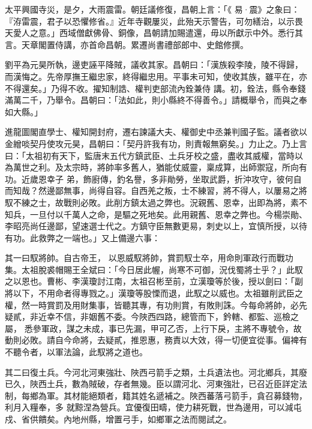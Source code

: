 \begin{pinyinscope}
 太平興國寺災，是夕，大雨震雷。朝廷議修復，昌朝上言：「《
 易·震》之象曰：『洊雷震，君子以恐懼修省。』近年寺觀屢災，此殆天示警告，可勿繕治，以示畏天愛人之意。」西域僧獻佛骨、銅像，昌朝請加賜遣還，毋以所獻示中外。悉行其言。天章閣置侍講，亦首命昌朝。累遷尚書禮部郎中、史館修撰。



 劉平為元昊所執，邊吏誣平降賊，議收其家。昌朝曰：「漢族殺李陵，陵不得歸，而漢悔之。先帝厚撫王繼忠家，終得繼忠用。平事未可知，使收其族，雖平在，亦不得還矣。」乃得不收。擢知制誥、權判吏部流內銓兼侍
 講。初，銓法，縣令奉錢滿萬二千，乃舉令。昌朝曰：「法如此，則小縣終不得善令。」請概舉令，而與之奉如大縣。」



 進龍圖閣直學士、權知開封府，遷右諫議大夫、權御史中丞兼判國子監。議者欲以金繒啖契丹使攻元昊，昌朝曰：「契丹許我有功，則責報無窮矣。」力止之。乃上言曰：「太祖初有天下，監唐末五代方鎮武臣、土兵牙校之盛，盡收其威權，當時以為萬世之利。及太宗時，將帥率多舊人，猶能仗威靈，稟成算，出師禦寇，所向有功。近歲恩幸子
 弟，飾廚傳，釣名譽，多非勛勞，坐取武爵，折沖攻守，彼何自而知哉？然邊鄙無事，尚得自容。自西羌之叛，士不練習，將不得人，以屢易之將馭不練之士，故戰則必敗。此削方鎮太過之弊也。況親舊、恩幸，出即為將，素不知兵，一旦付以千萬人之命，是驅之死地矣。此用親舊、恩幸之弊也。今楊崇勛、李昭亮尚任邊鄙，望速選士代之。方鎮守臣無數更易，刺史以上，宜慎所授，以待有功。此救弊之一端也。」又上備邊六事：



 其一曰馭將帥。自古帝王，
 以恩威馭將帥，賞罰馭士卒，用命則軍政行而戰功集。太祖脫裘帽賜王全斌曰：「今日居此幄，尚寒不可御，況伐蜀將士乎？」此馭之以恩也。曹彬、李漢瓊討江南，太祖召彬至前，立漢瓊等於後，授以劍曰：「副將以下，不用命者得專戮之。」漢瓊等股慄而退，此馭之以威也。太祖雖削武臣之權，然一時賞罰及用財集事，皆聽其專，有功則賞，有敗則誅。今每命將帥，必先疑貳，非近幸不信，非姻舊不委。今陜西四路，總管而下，鈐轄、都監、巡檢之屬，
 悉參軍政，謀之未成，事已先漏，甲可乙否，上行下戾，主將不專號令，故動則必敗。請自今命將，去疑貳，推恩惠，務責以大效，得一切便宜從事。偏裨有不聽令者，以軍法論，此馭將之道也。



 其二曰復土兵。今河北河東強壯、陜西弓箭手之類，土兵遺法也。河北鄉兵，其廢已久，陜西土兵，數為賊破，存者無幾。臣以謂河北、河東強壯，已召近臣詳定法制，每鄉為軍。其材能絕類者，籍其姓名遞補之。陜西蕃落弓箭手，貪召募錢物，利月入糧奉，多
 就黥涅為營兵。宜優復田疇，使力耕死戰，世為邊用，可以減屯戍、省供饋矣。內地州縣，增置弓手，如鄉軍之法而閱試之。




\end{pinyinscope}
